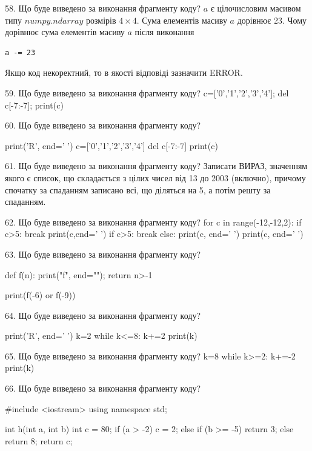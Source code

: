 \documentclass[11pt]{article}
\begin{document}
58. Що буде виведено за виконання фрагменту коду?
$a$ є цілочисловим масивом типу $numpy.ndarray$ розмірів $4{\times}4$. Сума елементів масиву $a$ дорівнює 23. Чому дорівнює сума елементів масиву $a$ після виконання 
\begin{verbatim}
a -= 23
\end{verbatim}


Якщо код некоректний, то в якості відповіді зазначити ERROR.




59. Що буде виведено за виконання фрагменту коду?
c=['0','1','2','3','4']; del c[-7:-7]; print(c)

60. Що буде виведено за виконання фрагменту коду?

print('R', end=' ')
c=['0','1','2','3','4']
del c[-7:-7]
print(c)



61. Що буде виведено за виконання фрагменту коду?
Записати ВИРАЗ, значенням якого є список, що складається з цілих чисел від 13 до 2003 (включно), причому спочатку за спаданням записано всі, що діляться на 5, а потім решту за спаданням.

62. Що буде виведено за виконання фрагменту коду?
for c in range(-12,-12,2):
    if c>5:
        break
        print(c,end=' ')
    if c>5:
        break
else:
    print(c, end=' ')
print(c, end=' ')


63. Що буде виведено за виконання фрагменту коду?

def f(n):
    print("f", end="");
    return n>-1

print(f(-6) or f(-9))


64. Що буде виведено за виконання фрагменту коду?

print('R', end=' ')
k=2
while k<=8:
    k+=2
print(k)



65. Що буде виведено за виконання фрагменту коду?
k=8
   while k>=2: k+=-2
   print(k)

66. Що буде виведено за виконання фрагменту коду?

#include <iostream>
using namespace std;

int h(int a, int b){
    int c = 80;
    if (a > -2)
        c = 2;
    else if (b >= -5)
         return 3;
    else 
        return 8;
    return c;
}
\end{document}
